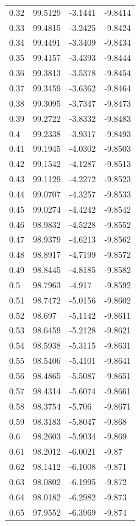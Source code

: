 \begin{tabular}{llll}
0.32 & 99.5129 & -3.1441 & -9.8414 \\
0.33 & 99.4815 & -3.2425 & -9.8424 \\
0.34 & 99.4491 & -3.3409 & -9.8434 \\
0.35 & 99.4157 & -3.4393 & -9.8444 \\
0.36 & 99.3813 & -3.5378 & -9.8454 \\
0.37 & 99.3459 & -3.6362 & -9.8464 \\
0.38 & 99.3095 & -3.7347 & -9.8473 \\
0.39 & 99.2722 & -3.8332 & -9.8483 \\
0.4 & 99.2338 & -3.9317 & -9.8493 \\
0.41 & 99.1945 & -4.0302 & -9.8503 \\
0.42 & 99.1542 & -4.1287 & -9.8513 \\
0.43 & 99.1129 & -4.2272 & -9.8523 \\
0.44 & 99.0707 & -4.3257 & -9.8533 \\
0.45 & 99.0274 & -4.4242 & -9.8542 \\
0.46 & 98.9832 & -4.5228 & -9.8552 \\
0.47 & 98.9379 & -4.6213 & -9.8562 \\
0.48 & 98.8917 & -4.7199 & -9.8572 \\
0.49 & 98.8445 & -4.8185 & -9.8582 \\
0.5 & 98.7963 & -4.917 & -9.8592 \\
0.51 & 98.7472 & -5.0156 & -9.8602 \\
0.52 & 98.697 & -5.1142 & -9.8611 \\
0.53 & 98.6459 & -5.2128 & -9.8621 \\
0.54 & 98.5938 & -5.3115 & -9.8631 \\
0.55 & 98.5406 & -5.4101 & -9.8641 \\
0.56 & 98.4865 & -5.5087 & -9.8651 \\
0.57 & 98.4314 & -5.6074 & -9.8661 \\
0.58 & 98.3754 & -5.706 & -9.8671 \\
0.59 & 98.3183 & -5.8047 & -9.868 \\
0.6 & 98.2603 & -5.9034 & -9.869 \\
0.61 & 98.2012 & -6.0021 & -9.87 \\
0.62 & 98.1412 & -6.1008 & -9.871 \\
0.63 & 98.0802 & -6.1995 & -9.872 \\
0.64 & 98.0182 & -6.2982 & -9.873 \\
0.65 & 97.9552 & -6.3969 & -9.874 \\

\end{tabular}
